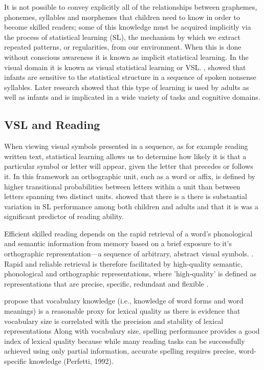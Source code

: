 \documentclass[review]{elsarticle}
\begin{document}
It is not possible to convey explicitly all of the relationships between graphemes, phonemes, syllables and morphemes that children need to know in order to become skilled readers; some of this knowledge must be acquired implicitly via the process of statistical learning (SL), the mechanism by which we extract repeated patterns, or regularities, from our environment.  When this is done without conscious awareness it is known as implicit statistical learning.  In the visual domain it is known as visual statistical learning or VSL.   \citet{saffranWordSegmentationRole1996}, showed that  infants are sensitive to the statistical structure in a sequence of spoken nonsense syllables.  Later research showed that this type of learning is used by adults as well as infants and is implicated in a wide variety of tasks and cognitive domains.

\subsection{ VSL and Reading}

When viewing visual symbols presented in a sequence, as for example reading written text, statistical learning allows us to determine how likely it is that a particular symbol or letter will appear, given the letter that precedes or follows it. In this framework an orthographic unit, such as a word or affix, is defined by higher transitional probabilities between letters within a unit than between letters spanning two distinct units.	\citet{arciuliStatisticalLearningRelated2012} showed that there is a there is substantial variation in SL performance among both children and adults and that it is was a significant predictor of reading ability.

Efficient skilled reading depends on the rapid retrieval of a  word’s phonological and semantic information from memory based on a brief exposure to it's orthographic representation—a sequence of arbitrary, abstract visual symbols.  \citep{rastlePlaceMorphologyLearning2019, castlesHowDoesOrthographic2006}. Rapid and reliable retrieval is therefore facilitated by high-quality semantic, phonological and orthographic \citep{perfettiLexicalQualityRevisited2017} representations, where 'high-quality' is defined as representations that are precise, specific, redundant and flexible \citep{perfettiReadingAbilityLexical2007}. 


\citet{yapIndividualDifferencesJoint2009} propose that vocabulary knowledge (i.e., knowledge of word forms and word meanings) is a reasonable proxy for lexical quality as there is evidence that vocabulary size is correlated with the precision and stability of lexical representations \citep{perfettiReadingAbilityLexical2007, perfettiLexicalQualityHypothesis2002, kiddIndividualDifferencesStatistical2016,kinoshitaAdditiveInteractiveEffects2006, kinoshitaHowLexicalDecision2006}  Along with vocabulary size, spelling performance provides a good index of lexical quality because while many reading tasks can be successfully achieved using only partial information, accurate spelling requires precise, word-specific knowledge (Perfetti, 1992).
\end{document}
